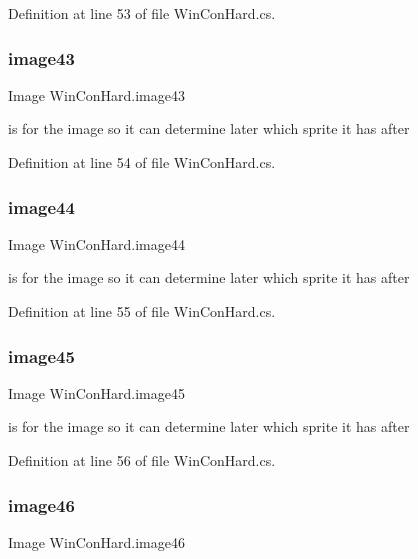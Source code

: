 Definition at line 53 of file Win\+Con\+Hard.\+cs.

\mbox{\label{class_win_con_hard_a8a07d6ff9cc41b6f56589f00b946404e}} 
\subsubsection{\texorpdfstring{image43}{image43}}
{\footnotesize\ttfamily Image Win\+Con\+Hard.\+image43}

is for the image so it can determine later which sprite it has after 

Definition at line 54 of file Win\+Con\+Hard.\+cs.

\mbox{\label{class_win_con_hard_a5ee301d2c349e2279be56127bb80e848}} 
\subsubsection{\texorpdfstring{image44}{image44}}
{\footnotesize\ttfamily Image Win\+Con\+Hard.\+image44}

is for the image so it can determine later which sprite it has after 

Definition at line 55 of file Win\+Con\+Hard.\+cs.

\mbox{\label{class_win_con_hard_abdf37b77124f68bda0c9265c58759041}} 
\subsubsection{\texorpdfstring{image45}{image45}}
{\footnotesize\ttfamily Image Win\+Con\+Hard.\+image45}

is for the image so it can determine later which sprite it has after 

Definition at line 56 of file Win\+Con\+Hard.\+cs.

\mbox{\label{class_win_con_hard_a067d066c87e0af8bf62975ef5ae7cf5f}} 
\subsubsection{\texorpdfstring{image46}{image46}}
{\footnotesize\ttfamily Image Win\+Con\+Hard.\+image46}

